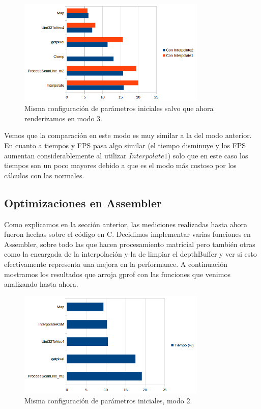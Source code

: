 \documentclass[a4paper]{article}
\begin{document}
\begin{figure}[H]
    \centering
    \includegraphics[width=0.8\textwidth]{Imagenes/gprof3.png}
    \caption{Misma configuración de parámetros iniciales salvo que ahora renderizamos en modo 3.}
    \label{fig:mesh1}
\end{figure}

Vemos que la comparación en este modo es muy similar a la del modo anterior. En cuanto a tiempos y FPS pasa algo similar (el tiempo disminuye y los FPS aumentan considerablemente al utilizar $Interpolate1$) solo que en este caso los tiempos son un poco mayores debido a que es el modo más costoso por los cálculos con las normales.

\subsection{Optimizaciones en Assembler}
Como explicamos en la sección anterior, las mediciones realizadas hasta ahora fueron hechas sobre el código en C. Decidimos implementar varias funciones en Assembler, sobre todo las que hacen procesamiento matricial pero también otras como la encargada de la interpolación y la de limpiar el depthBuffer y ver si esto efectivamente representa una mejora en la performance. A continuación mostramos los resultados que arroja gprof con las funciones que venimos analizando hasta ahora.

\begin{figure}[H]
    \centering
    \includegraphics[width=0.8\textwidth]{Imagenes/gprof4.png}
    \caption{Misma configuración de parámetros iniciales, modo 2.}
    \label{fig:mesh1}
\end{figure}
\end{document}
